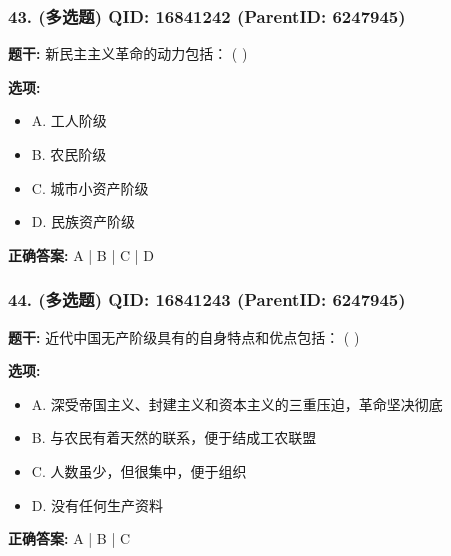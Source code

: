 \documentclass[12pt,UTF8]{ctexart}
\begin{document}
\subsubsection*{43. (多选题) \small QID: 16841242 (ParentID: 6247945)}

\textbf{题干:}
新民主主义革命的动力包括： ( )



\textbf{选项:}
\begin{itemize}[leftmargin=*]

  \item A. 工人阶级

  \item B. 农民阶级

  \item C. 城市小资产阶级

  \item D. 民族资产阶级

\end{itemize}

\textbf{正确答案:}
A | B | C | D

\vspace{0.3em}\hrulefill\vspace{0.7em}

\subsubsection*{44. (多选题) \small QID: 16841243 (ParentID: 6247945)}

\textbf{题干:}
近代中国无产阶级具有的自身特点和优点包括： ( )



\textbf{选项:}
\begin{itemize}[leftmargin=*]

  \item A. 深受帝国主义、封建主义和资本主义的三重压迫，革命坚决彻底

  \item B. 与农民有着天然的联系，便于结成工农联盟

  \item C. 人数虽少，但很集中，便于组织

  \item D. 没有任何生产资料

\end{itemize}

\textbf{正确答案:}
A | B | C

\vspace{0.3em}\hrulefill\vspace{0.7em}
\end{document}
